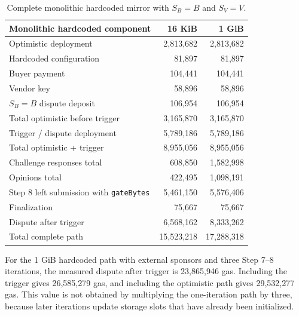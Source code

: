 \begin{table}[H]
  \centering
  \small
  \begin{tabularx}{\linewidth}{>{\raggedright\arraybackslash}Xrr}
    \toprule
    Monolithic hardcoded component & 16 KiB & 1 GiB \\
    \midrule
    Optimistic deployment & 2,813,682 & 2,813,682 \\
    Hardcoded configuration & 81,897 & 81,897 \\
    Buyer payment & 104,441 & 104,441 \\
    Vendor key & 58,896 & 58,896 \\
    \(S_B=B\) dispute deposit & 106,954 & 106,954 \\
    Total optimistic before trigger & 3,165,870 & 3,165,870 \\
    Trigger / dispute deployment & 5,789,186 & 5,789,186 \\
    Total optimistic + trigger & 8,955,056 & 8,955,056 \\
    Challenge responses total & 608,850 & 1,582,998 \\
    Opinions total & 422,495 & 1,098,191 \\
    Step 8 left submission with \texttt{gateBytes} & 5,461,150 & 5,576,406 \\
    Finalization & 75,667 & 75,667 \\
    Dispute after trigger & 6,568,162 & 8,333,262 \\
    \midrule
    Total complete path & 15,523,218 & 17,288,318 \\
    \bottomrule
  \end{tabularx}
  \caption{Complete monolithic hardcoded mirror with \(S_B=B\) and \(S_V=V\).}
  \label{tab:app-monolithic-hardcoded-mirror}
\end{table}

For the 1 GiB hardcoded path with external sponsors and three Step 7--8 iterations, the
measured dispute after trigger is 23,865,946 gas. Including the trigger gives 26,585,279
gas, and including the optimistic path gives 29,532,277 gas. This value is not obtained by
multiplying the one-iteration path by three, because later iterations update storage slots
that have already been initialized.
